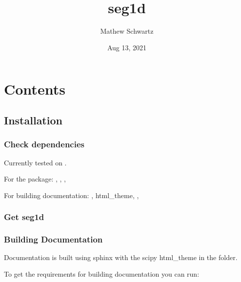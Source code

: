 \documentclass[letterpaper,10pt,english]{sphinxmanual}
\title{seg1d}
\date{Aug 13, 2021}
\author{Mathew Schwartz}
\begin{document}
\pagestyle{empty}
\sphinxmaketitle
\pagestyle{plain}
\sphinxtableofcontents
\pagestyle{normal}
\label{\detokenize{index::doc}}



\chapter{Contents}
\label{\detokenize{index:contents}}

\section{Installation}
\label{\detokenize{install:installation}}\label{\detokenize{install::doc}}

\subsection{Check dependencies}
\label{\detokenize{install:check-dependencies}}
\sphinxAtStartPar
Currently tested on .

\sphinxAtStartPar
For the package: , , , 

\sphinxAtStartPar
For building documentation: ,  html\_theme, , 


\subsection{Get seg1d}
\label{\detokenize{install:get-seg1d}}
\sphinxAtStartPar
{}


\subsection{Building Documentation}
\label{\detokenize{install:building-documentation}}
\sphinxAtStartPar
Documentation is built using sphinx with the scipy html\_theme in the  folder.

\sphinxAtStartPar
To get the requirements for building documentation you can run:

\sphinxAtStartPar
{}
\end{document}
